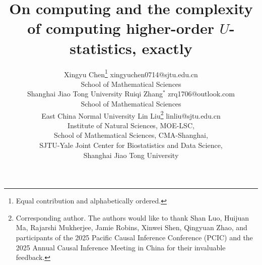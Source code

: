 \documentclass[twoside,11pt]{article}
\begin{document}
\title{On computing and the complexity of computing higher-order $U$-statistics, exactly}

\author{\name Xingyu Chen\thanks{Equal contribution and alphabetically ordered.} \email xingyuchen0714@sjtu.edu.cn \\
\addr School of Mathematical Sciences \\
Shanghai Jiao Tong University
\AND
\name Ruiqi Zhang$^{*}$ \email zrq1706@outlook.com \\
\addr School of Mathematical Sciences \\
East China Normal University
\AND
\name Lin Liu\thanks{Corresponding author. The authors would like to thank Shan Luo, Huijuan Ma, Rajarshi Mukherjee, Jamie Robins, Xinwei Shen, Qingyuan Zhao, and participants of the 2025 Pacific Causal Inference Conference (PCIC) and the 2025 Annual Causal Inference Meeting in China for their invaluable feedback.} \email linliu@sjtu.edu.cn \\
\addr Institute of Natural Sciences, MOE-LSC, \\
School of Mathematical Sciences, CMA-Shanghai, \\
SJTU-Yale Joint Center for Biostatistics and Data Science, \\
Shanghai Jiao Tong University
}


\maketitle
\end{document}
